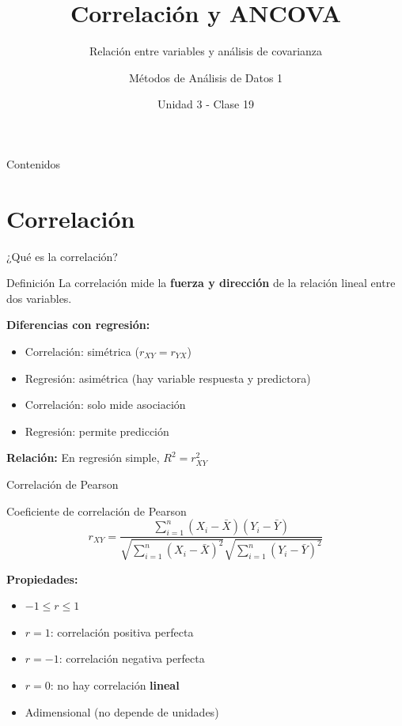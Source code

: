 \documentclass[aspectratio=169]{beamer}
\title{Correlación y ANCOVA}
\subtitle{Relación entre variables y análisis de covarianza}
\author{Métodos de Análisis de Datos 1}
\institute{Universidad Nacional del Sur}
\date{Unidad 3 - Clase 19}
\begin{document}
\frame{\titlepage}

\begin{frame}{Contenidos}
\tableofcontents
\end{frame}

\section{Correlación}

\begin{frame}{¿Qué es la correlación?}
\begin{block}{Definición}
La correlación mide la \textbf{fuerza y dirección} de la relación lineal entre dos variables.
\end{block}

\vspace{0.5cm}
\textbf{Diferencias con regresión:}
\begin{itemize}
    \item Correlación: simétrica ($r_{XY} = r_{YX}$)
    \item Regresión: asimétrica (hay variable respuesta y predictora)
    \item Correlación: solo mide asociación
    \item Regresión: permite predicción
\end{itemize}

\vspace{0.3cm}
\textbf{Relación:} En regresión simple, $R^2 = r_{XY}^2$
\end{frame}

\begin{frame}{Correlación de Pearson}
\begin{block}{Coeficiente de correlación de Pearson}
\[
r_{XY} = \frac{\sum_{i=1}^{n}(X_i - \bar{X})(Y_i - \bar{Y})}{\sqrt{\sum_{i=1}^{n}(X_i - \bar{X})^2} \sqrt{\sum_{i=1}^{n}(Y_i - \bar{Y})^2}}
\]
\end{block}

\vspace{0.3cm}
\textbf{Propiedades:}
\begin{itemize}
    \item $-1 \leq r \leq 1$
    \item $r = 1$: correlación positiva perfecta
    \item $r = -1$: correlación negativa perfecta
    \item $r = 0$: no hay correlación \textbf{lineal}
    \item Adimensional (no depende de unidades)
\end{itemize}
\end{frame}
\end{document}
